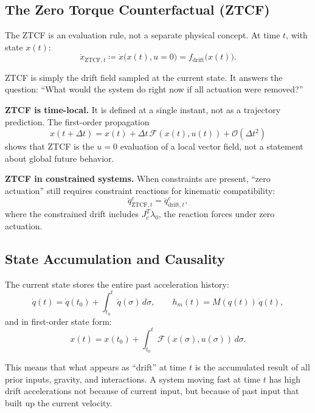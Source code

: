 \documentclass[11pt]{article}
\begin{document}
\subsection{The Zero Torque Counterfactual (ZTCF)}

The ZTCF is an evaluation rule, not a separate physical concept.
At time $t$, with state $x(t)$:
\begin{equation}\label{eq:ztcf-def}
\dot{x}_{\mathrm{ZTCF},t} \coloneqq \dot{x}\bigl(x(t), u = 0\bigr) = f_{\mathrm{drift}}\bigl(x(t)\bigr).
\end{equation}

ZTCF is simply the drift field sampled at the current state.
It answers the question: ``What would the system do right now if all actuation were removed?''

\textbf{ZTCF is time-local.}
It is defined at a single instant, not as a trajectory prediction.
The first-order propagation
\begin{equation}
x(t + \Delta t) = x(t) + \Delta t\, \mathcal{F}(x(t), u(t)) + \mathcal{O}(\Delta t^2)
\end{equation}
shows that ZTCF is the $u = 0$ evaluation of a local vector field, not a statement about global future behavior.

\textbf{ZTCF in constrained systems.}
When constraints are present, ``zero actuation'' still requires constraint reactions for kinematic compatibility:
\begin{equation}
\ddot{q}_{\mathrm{ZTCF},t}^{c} = \ddot{q}_{\mathrm{drift},t}^{c},
\end{equation}
where the constrained drift includes $J_c^T \lambda_0$, the reaction forces under zero actuation.


\subsection{State Accumulation and Causality}

The current state stores the entire past acceleration history:
\begin{equation}\label{eq:state-accumulation}
\dot{q}(t) = \dot{q}(t_0) + \int_{t_0}^{t} \ddot{q}(\sigma)\,d\sigma, \qquad h_m(t) = M(q(t))\,\dot{q}(t),
\end{equation}
and in first-order state form:
\begin{equation}
x(t) = x(t_0) + \int_{t_0}^{t} \mathcal{F}(x(\sigma), u(\sigma))\,d\sigma.
\end{equation}

This means that what appears as ``drift'' at time $t$ is the accumulated result of all prior inputs, gravity, and interactions.
A system moving fast at time $t$ has high drift accelerations not because of current input, but because of past input that built up the current velocity.
\end{document}

